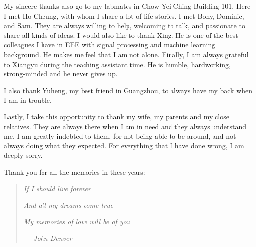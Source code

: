 \begin{acknowledgements}
My sincere thanks also go to my labmates in Chow Yei Ching Building 101. Here I met Ho-Cheung, with whom I share a lot of life stories. I met Bony, Dominic, and Sam. They are always willing to help, welcoming to talk, and passionate to share all kinds of ideas. I would also like to thank Xing. He is one of the best colleagues I have in EEE with signal processing and machine learning background. He makes me feel that I am not alone. Finally, I am always grateful to Xiangyu during the teaching assistant time. He is humble, hardworking, strong-minded and he never gives up.

I also thank Yuheng, my best friend in Guangzhou, to always have my back when I am in trouble.

Lastly, I take this opportunity to thank my wife, my parents and my close relatives. They are always there when I am in need and they always understand me. I am greatly indebted to them, for not being able to be around, and not always doing what they expected. For everything that I have done wrong, I am deeply sorry.

Thank you for all the memories in these years:
\begin{quote}
\centering
\textit{If I should live forever}

\textit{And all my dreams come true}

\textit{My memories of love will be of you}

\textit{--- John Denver}
\end{quote}

\end{acknowledgements}




